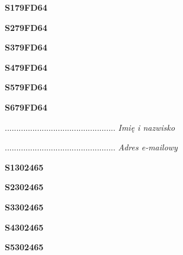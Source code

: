 \begin{turn}{90}\huge \textbf{S179FD64}\end{turn}

\begin{turn}{90}\huge \textbf{S279FD64}\end{turn}

\begin{turn}{90}\huge \textbf{S379FD64}\end{turn}

\begin{turn}{90}\huge \textbf{S479FD64}\end{turn}

\begin{turn}{90}\huge \textbf{S579FD64}\end{turn}

\begin{turn}{90}\huge \textbf{S679FD64}\end{turn}

\begin{turn}{90}\begin{minipage}{\linewidth} \vspace{20mm} ................................................  \textit{Imię i nazwisko}\end{minipage}\end{turn}

\begin{turn}{90}\begin{minipage}{\linewidth} \vspace{20mm} ................................................  \textit{Adres e-mailowy}\end{minipage}\end{turn}

\begin{turn}{90}\huge \textbf{S1302465}\end{turn}

\begin{turn}{90}\huge \textbf{S2302465}\end{turn}

\begin{turn}{90}\huge \textbf{S3302465}\end{turn}

\begin{turn}{90}\huge \textbf{S4302465}\end{turn}

\begin{turn}{90}\huge \textbf{S5302465}\end{turn}

